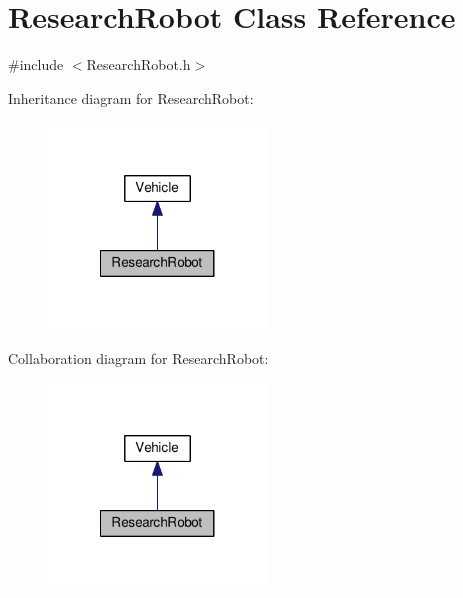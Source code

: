 \hypertarget{class_research_robot}{\section{Research\-Robot Class Reference}
\label{class_research_robot}
}


{\ttfamily \#include $<$Research\-Robot.\-h$>$}



Inheritance diagram for Research\-Robot\-:
\nopagebreak
\begin{figure}[H]
\begin{center}
\leavevmode
\includegraphics[width=164pt]{class_research_robot__inherit__graph}
\end{center}
\end{figure}


Collaboration diagram for Research\-Robot\-:
\nopagebreak
\begin{figure}[H]
\begin{center}
\leavevmode
\includegraphics[width=164pt]{class_research_robot__coll__graph}
\end{center}
\end{figure}
